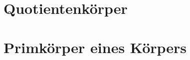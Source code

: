 \section{Quotientenkörper}





\section{Primkörper eines Körpers}

















% 
% 
% 














